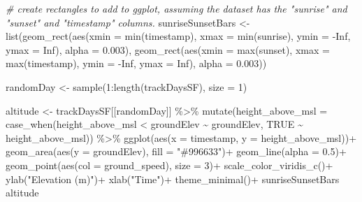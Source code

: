 \documentclass[
]{article}
\newenvironment{Shaded}{\begin{snugshade}}{\end{snugshade}}
\newcommand{\AttributeTok}[1]{\textcolor[rgb]{0.77,0.63,0.00}{#1}}
\newcommand{\CommentTok}[1]{\textcolor[rgb]{0.56,0.35,0.01}{\textit{#1}}}
\newcommand{\ConstantTok}[1]{\textcolor[rgb]{0.00,0.00,0.00}{#1}}
\newcommand{\DecValTok}[1]{\textcolor[rgb]{0.00,0.00,0.81}{#1}}
\newcommand{\FloatTok}[1]{\textcolor[rgb]{0.00,0.00,0.81}{#1}}
\newcommand{\FunctionTok}[1]{\textcolor[rgb]{0.00,0.00,0.00}{#1}}
\newcommand{\NormalTok}[1]{#1}
\newcommand{\OtherTok}[1]{\textcolor[rgb]{0.56,0.35,0.01}{#1}}
\newcommand{\SpecialCharTok}[1]{\textcolor[rgb]{0.00,0.00,0.00}{#1}}
\newcommand{\StringTok}[1]{\textcolor[rgb]{0.31,0.60,0.02}{#1}}
\begin{document}
\begin{Shaded}
\begin{Highlighting}[]
\CommentTok{\# create rectangles to add to ggplot, assuming the dataset has the "sunrise" and "sunset" and "timestamp" columns.}
\NormalTok{sunriseSunsetBars }\OtherTok{\textless{}{-}} \FunctionTok{list}\NormalTok{(}\FunctionTok{geom\_rect}\NormalTok{(}\FunctionTok{aes}\NormalTok{(}\AttributeTok{xmin =} \FunctionTok{min}\NormalTok{(timestamp),}
                                        \AttributeTok{xmax =} \FunctionTok{min}\NormalTok{(sunrise),}
                                        \AttributeTok{ymin =} \SpecialCharTok{{-}}\ConstantTok{Inf}\NormalTok{,}
                                        \AttributeTok{ymax =} \ConstantTok{Inf}\NormalTok{), }\AttributeTok{alpha =} \FloatTok{0.003}\NormalTok{),}
                          \FunctionTok{geom\_rect}\NormalTok{(}\FunctionTok{aes}\NormalTok{(}\AttributeTok{xmin =} \FunctionTok{max}\NormalTok{(sunset),}
                                        \AttributeTok{xmax =} \FunctionTok{max}\NormalTok{(timestamp),}
                                        \AttributeTok{ymin =} \SpecialCharTok{{-}}\ConstantTok{Inf}\NormalTok{,}
                                        \AttributeTok{ymax =} \ConstantTok{Inf}\NormalTok{), }\AttributeTok{alpha =} \FloatTok{0.003}\NormalTok{))}

\NormalTok{randomDay }\OtherTok{\textless{}{-}} \FunctionTok{sample}\NormalTok{(}\DecValTok{1}\SpecialCharTok{:}\FunctionTok{length}\NormalTok{(trackDaysSF), }\AttributeTok{size =} \DecValTok{1}\NormalTok{)}

\NormalTok{altitude }\OtherTok{\textless{}{-}}\NormalTok{ trackDaysSF[[randomDay]] }\SpecialCharTok{\%\textgreater{}\%}
  \FunctionTok{mutate}\NormalTok{(}\AttributeTok{height\_above\_msl =} \FunctionTok{case\_when}\NormalTok{(height\_above\_msl }\SpecialCharTok{\textless{}}\NormalTok{ groundElev }\SpecialCharTok{\textasciitilde{}}\NormalTok{ groundElev,}
                                      \ConstantTok{TRUE} \SpecialCharTok{\textasciitilde{}}\NormalTok{ height\_above\_msl)) }\SpecialCharTok{\%\textgreater{}\%}
  \FunctionTok{ggplot}\NormalTok{(}\FunctionTok{aes}\NormalTok{(}\AttributeTok{x =}\NormalTok{ timestamp, }\AttributeTok{y =}\NormalTok{ height\_above\_msl))}\SpecialCharTok{+}
  \FunctionTok{geom\_area}\NormalTok{(}\FunctionTok{aes}\NormalTok{(}\AttributeTok{y =}\NormalTok{ groundElev), }\AttributeTok{fill =} \StringTok{"\#996633"}\NormalTok{)}\SpecialCharTok{+}
  \FunctionTok{geom\_line}\NormalTok{(}\AttributeTok{alpha =} \FloatTok{0.5}\NormalTok{)}\SpecialCharTok{+}
  \FunctionTok{geom\_point}\NormalTok{(}\FunctionTok{aes}\NormalTok{(}\AttributeTok{col =}\NormalTok{ ground\_speed), }\AttributeTok{size =} \DecValTok{3}\NormalTok{)}\SpecialCharTok{+}
  \FunctionTok{scale\_color\_viridis\_c}\NormalTok{()}\SpecialCharTok{+}
  \FunctionTok{ylab}\NormalTok{(}\StringTok{"Elevation (m)"}\NormalTok{)}\SpecialCharTok{+}
  \FunctionTok{xlab}\NormalTok{(}\StringTok{"Time"}\NormalTok{)}\SpecialCharTok{+}
  \FunctionTok{theme\_minimal}\NormalTok{()}\SpecialCharTok{+}
\NormalTok{  sunriseSunsetBars}
\NormalTok{altitude}
\end{Highlighting}
\end{Shaded}
\end{document}
